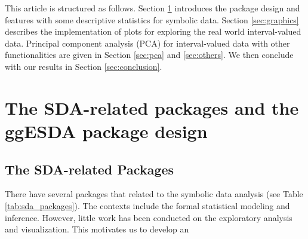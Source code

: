 \documentclass[article]{jss}
\begin{document}
This article is structured as follows. Section \ref{sec:design}
introduces the  package design and features with some
descriptive statistics for symbolic data. Section \ref{sec:graphics}
describes the implementation of plots for exploring the real world
interval-valued data. Principal component analysis (PCA) for
interval-valued data with other functionalities are given in Section
\ref{sec:pca} and \ref{sec:others}. We then conclude with our results
in Section \ref{sec:conclusion}.



\section{The SDA-related packages and the ggESDA package design}\label{sec:design}


\subsection{The SDA-related Packages}
There have several  packages that related to
the symbolic data analysis (see Table \ref{tab:sda_packages}). The
contexts include the formal statistical modeling and inference.
However, little work has been conducted on the exploratory analysis
and visualization. This motivates us to develop an 
\end{document}
